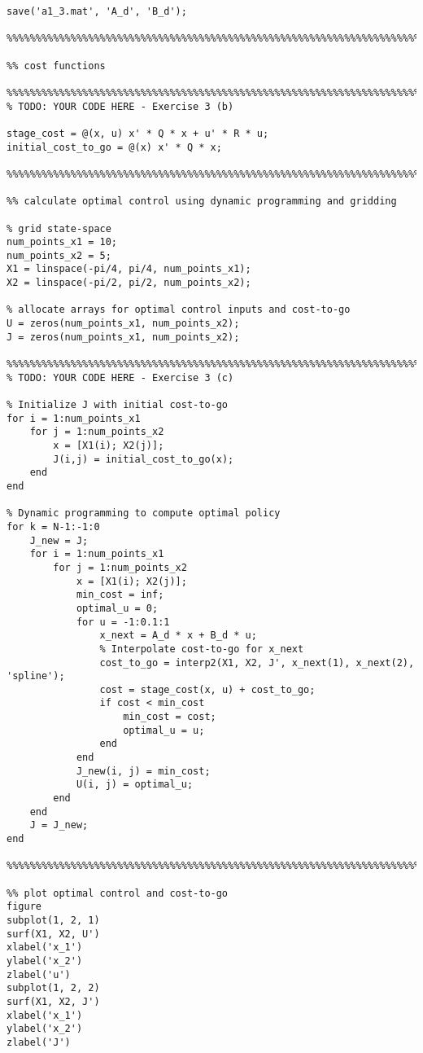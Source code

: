 \documentclass[8pt, a4paper, oneside, justified]{article}
\numberwithin{equation}{section}
\begin{document}
\begin{lstlisting}
save('a1_3.mat', 'A_d', 'B_d');

%%%%%%%%%%%%%%%%%%%%%%%%%%%%%%%%%%%%%%%%%%%%%%%%%%%%%%%%%%%%%%%%%%%%%%%%%%%

%% cost functions

%%%%%%%%%%%%%%%%%%%%%%%%%%%%%%%%%%%%%%%%%%%%%%%%%%%%%%%%%%%%%%%%%%%%%%%%%%%
% TODO: YOUR CODE HERE - Exercise 3 (b)

stage_cost = @(x, u) x' * Q * x + u' * R * u;
initial_cost_to_go = @(x) x' * Q * x;

%%%%%%%%%%%%%%%%%%%%%%%%%%%%%%%%%%%%%%%%%%%%%%%%%%%%%%%%%%%%%%%%%%%%%%%%%%%

%% calculate optimal control using dynamic programming and gridding

% grid state-space
num_points_x1 = 10;
num_points_x2 = 5;
X1 = linspace(-pi/4, pi/4, num_points_x1);
X2 = linspace(-pi/2, pi/2, num_points_x2);

% allocate arrays for optimal control inputs and cost-to-go 
U = zeros(num_points_x1, num_points_x2);
J = zeros(num_points_x1, num_points_x2);

%%%%%%%%%%%%%%%%%%%%%%%%%%%%%%%%%%%%%%%%%%%%%%%%%%%%%%%%%%%%%%%%%%%%%%%%%%%
% TODO: YOUR CODE HERE - Exercise 3 (c)

% Initialize J with initial cost-to-go
for i = 1:num_points_x1
    for j = 1:num_points_x2
        x = [X1(i); X2(j)];
        J(i,j) = initial_cost_to_go(x);
    end
end

% Dynamic programming to compute optimal policy
for k = N-1:-1:0
    J_new = J;
    for i = 1:num_points_x1
        for j = 1:num_points_x2
            x = [X1(i); X2(j)];
            min_cost = inf;
            optimal_u = 0;
            for u = -1:0.1:1
                x_next = A_d * x + B_d * u;
                % Interpolate cost-to-go for x_next
                cost_to_go = interp2(X1, X2, J', x_next(1), x_next(2), 'spline');
                cost = stage_cost(x, u) + cost_to_go;
                if cost < min_cost
                    min_cost = cost;
                    optimal_u = u;
                end
            end
            J_new(i, j) = min_cost;
            U(i, j) = optimal_u;
        end
    end
    J = J_new;
end

%%%%%%%%%%%%%%%%%%%%%%%%%%%%%%%%%%%%%%%%%%%%%%%%%%%%%%%%%%%%%%%%%%%%%%%%%%%

%% plot optimal control and cost-to-go
figure
subplot(1, 2, 1)
surf(X1, X2, U')
xlabel('x_1')
ylabel('x_2')
zlabel('u')
subplot(1, 2, 2)
surf(X1, X2, J')
xlabel('x_1')
ylabel('x_2')
zlabel('J')


\end{lstlisting}
\end{document}

